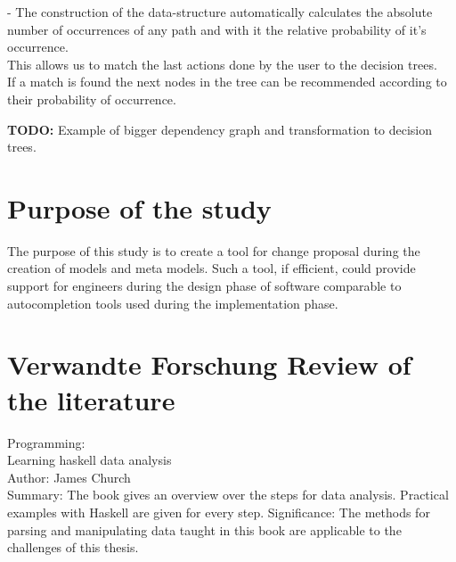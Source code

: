 \documentclass[10pt,a4paper,oneside]{scrartcl}
\begin{document}
	\begin{algorithm}
	\end{algorithm}
	- The construction of the data-structure automatically calculates the absolute number of occurrences of any path and with it the relative probability of it's occurrence.
	\\
	This allows us to match the last actions done by the user to the decision trees. 
	\\
	If a match is found the next nodes in the tree can be recommended according to their probability of occurrence.

	\textbf{TODO:} Example of bigger dependency graph and transformation to decision trees.

	
	\section{Purpose of the study}
	The purpose of this study is to create a tool for change proposal during the creation of models and meta models. Such a tool, if efficient, could provide support for engineers during the design phase of software comparable to autocompletion tools used during the implementation phase. 
	
	\section{
		{Verwandte Forschung}
		{Review of the literature}}
	
	Programming:\\
	Learning haskell data analysis\\
	Author: James Church\\
	Summary: The book gives an overview over the steps for data analysis. Practical examples with Haskell are given for every step.
	Significance: The methods for parsing and manipulating data taught in this book are applicable to the challenges of this thesis.\\
	
\end{document}
